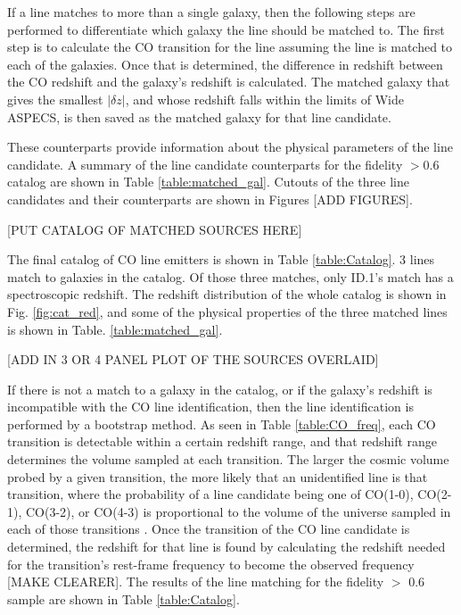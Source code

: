 If a line matches to more than a single galaxy, then the following steps are performed to differentiate which galaxy the line should be matched to. The first step is to calculate the CO transition for the line assuming the line is matched to each of the galaxies. Once that is determined, the difference in redshift between the CO redshift and the galaxy's redshift is calculated. The matched galaxy that gives the smallest $|\delta z|$, and whose redshift falls within the limits of Wide ASPECS, is then saved as the matched galaxy for that line candidate. 

These counterparts provide information about the physical parameters of the line candidate. A summary of the line candidate counterparts for the fidelity $>$0.6 catalog are shown in Table \ref{table:matched_gal}. Cutouts of the three line candidates and their counterparts are shown in Figures [ADD FIGURES].

[PUT CATALOG OF MATCHED SOURCES HERE]

The final catalog of CO line emitters is shown in Table \ref{table:Catalog}. 3 lines match to galaxies in the catalog. Of those three matches, only ID.1's match has a spectroscopic redshift. The redshift distribution of the whole catalog is shown in Fig. \ref{fig:cat_red}, and some of the physical properties of the three matched lines is shown in Table. \ref{table:matched_gal}. 

[ADD IN 3 OR 4 PANEL PLOT OF THE SOURCES OVERLAID]


If there is not a match to a galaxy in the catalog, or if the galaxy's redshift is incompatible with the CO line identification, then the line identification is performed by a bootstrap method. As seen in Table \ref{table:CO_freq}, each CO transition is detectable within a certain redshift range, and that redshift range determines the volume sampled at each transition. The larger the cosmic volume probed by a given transition, the more likely that an unidentified line is that transition, where the probability of a line candidate being one of CO(1-0), CO(2-1), CO(3-2), or CO(4-3) is proportional to the volume of the universe sampled in each of those transitions \cite{walter2016alma, decarli2019alma}. Once the transition of the CO line candidate is determined, the redshift for that line is found by calculating the redshift needed for the transition's rest-frame frequency to become the observed frequency [MAKE CLEARER]. The results of the line matching for the fidelity $>$ 0.6 sample are shown in Table \ref{table:Catalog}.

